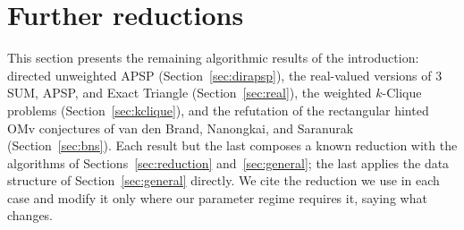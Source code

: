 \section{Further reductions}\label{sec:other}

{This section presents the remaining algorithmic results of the introduction: directed unweighted APSP (Section~\ref{sec:dirapsp}), the real-valued versions of $3$SUM, APSP, and Exact Triangle (Section~\ref{sec:real}), the weighted $k$-Clique problems (Section~\ref{sec:kclique}), and the refutation of the rectangular hinted OMv conjectures of van den Brand, Nanongkai, and Saranurak~\cite{BNS19} (Section~\ref{sec:bns}). Each result but the last composes a known reduction with the algorithms of Sections~\ref{sec:reduction} and~\ref{sec:general}; the last applies the data structure of Section~\ref{sec:general} directly. We cite the reduction we use in each case and modify it only where our parameter regime requires it, saying what changes.}

